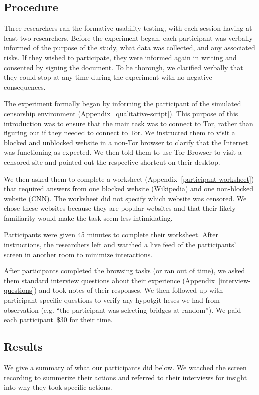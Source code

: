 \documentclass[USenglish,oneside,twocolumn]{article}
\begin{document}
\subsection{Procedure}
Three researchers ran the formative usability testing, with each session having at least two researchers.  
Before the experiment began, each participant was verbally informed of the purpose of the 
study, what data was collected, and any associated risks. If they wished to participate,
they were informed again in writing and consented by signing the document. To be thorough, 
we clarified verbally that they could stop at any time during the experiment with no negative consequences. 

The experiment formally began by informing the participant of the simulated censorship environment (Appendix~\ref{qualitative-script}). This purpose of this introduction was to ensure that the main task
was to connect to Tor, rather than figuring out if they needed to connect to Tor. 
We instructed them to visit a blocked and unblocked website
in a non-Tor browser to clarify that the Internet was functioning as expected. 
We then told them to use Tor Browser to visit a censored site and pointed out 
the respective shortcut on their desktop.

We then asked them to complete a worksheet (Appendix~\ref{participant-worksheet}) that 
required answers from one blocked website (Wikipedia) and one non-blocked website (CNN).
The worksheet did not specify which website was censored. 
We chose these websites because they are popular websites and that their likely familiarity 
would make the task seem less intimidating. 

Participants were given 45 minutes to complete their worksheet. 
After instructions, the researchers left and watched a live feed of the participants' screen in another room to minimize interactions.

After participants completed the browsing tasks (or ran out of time),
we asked them standard interview questions about their experience (Appendix~\ref{interview-questions}) and took notes of their responses. We then followed up with participant-specific questions to verify any hypotgit heses we had from observation (e.g. ``the participant was selecting bridges at random''). We paid each participant~\$30 for their time. 

\subsection{Results} 
We give a summary of what our participants did below. We watched the screen recording to summerize their actions and referred to their interviews for insight into why they took specific actions. 
\end{document}
